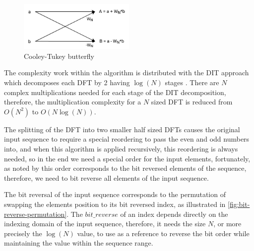 \documentclass[
  oneside,
  11pt, a4paper,
  footinclude=true,
  headinclude=true,
  cleardoublepage=empty
]{scrbook}
\begin{document}
\begin{figure}[h] 
    \centering
    \includegraphics[width=0.5\textwidth]{img/dit_butterfly.png}
    \caption{Cooley-Tukey butterfly}
    \label{fig:dit-butterfly}
\end{figure}


The complexity work within the algorithm is distributed with the DIT approach which decomposes each DFT by 2 having \(\log{(N)}\) stages \cite{smith2007mathematics}. There are \(N\) complex multiplications needed for each stage of the DIT decomposition, therefore, the multiplication complexity for a \(N\) sized DFT is reduced from \(O(N^{2})\) to \(O(N \log{(N)})\).
\newline

The splitting of the DFT into two smaller half sized DFTs causes the original input sequence to require a special reordering to pass the even and odd numbers into, and when this algorithm is applied recursively, this reordering is always needed, so in the end we need a special order for the input elements, fortunately, as noted by \cite{thong1981algebraic} this order corresponds to the bit reversed elements of the sequence, therefore, we need to bit reverse all elements of the input sequence.

The bit reversal of the input sequence corresponds to the permutation of swapping the elements position to its bit reversed index, as illustrated in \autoref{fig:bit-reverse-permutation}. The $bit\_reverse$ of an index depends directly on the indexing domain of the input sequence, therefore, it needs the size $N$, or more precisely the $\log{(N)}$ value, to use as a reference to reverse the bit order while maintaining the value within the sequence range.
\end{document}
